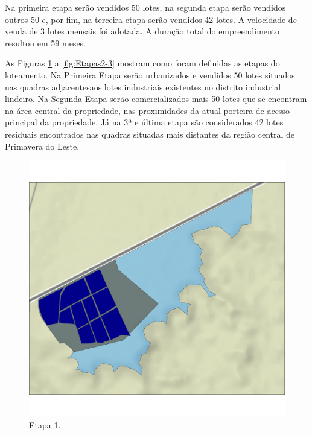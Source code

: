 \documentclass[
  10pt,
  a4paper]{article}
\begin{document}
Na primeira etapa serão vendidos 50 lotes, na segunda etapa serão
vendidos outros 50 e, por fim, na terceira etapa serão vendidos 42
lotes. A velocidade de venda de 3 lotes mensais foi adotada. A duração
total do empreendimento resultou em 59 meses.

As Figuras \ref{fig:Etapa1} a \ref{fig:Etapas2-3} mostram como foram
definidas as etapas do loteamento. Na Primeira Etapa serão urbanizados e
vendidos 50 lotes situados nas quadras adjacentesaos lotes industriais
existentes no distrito industrial lindeiro. Na Segunda Etapa serão
comercializados mais 50 lotes que se encontram na área central da
propriedade, nas proximidades da atual porteira de acesso principal da
propriedade. Já na 3ª e última etapa são considerados 42 lotes residuais
encontrados nas quadras situadas mais distantes da região central de
Primavera do Leste.

\begin{figure}[H]

{\centering \includegraphics[width=0.7\linewidth]{images/Etapa1-1} 

}

\caption{Etapa 1.}\label{fig:Etapa1}
\end{figure}
\end{document}
